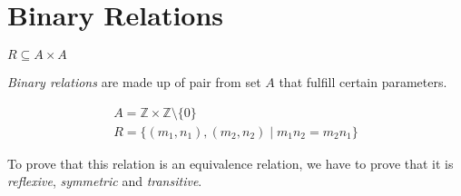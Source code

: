 \documentclass[00_complete]{subfiles}
\begin{document}
\section{Binary Relations}
\begin{definition}
\(R \subseteq A \times A\)

\emph{Binary relations} are made up of pair from set \(A\) that fulfill certain
parameters.

\end{definition}
\begin{example}
\begin{gather*}
A = \mathbb{Z} \times \mathbb{Z} \setminus \{0\} \\
R=\{(m_1,n_1),(m_2,n_2) \mid m_1n_2=m_2n_1\}
\end{gather*}

To prove that this relation is an equivalence relation, we have to prove
that it is \emph{reflexive}, \emph{symmetric} and \emph{transitive}.
\end{example}
\end{document}
